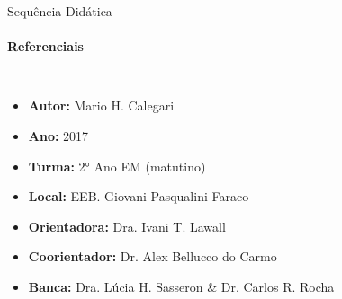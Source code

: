 \documentclass[aspectratio=169]{beamer}
\begin{document}
\begin{frame}{Sequência Didática}
	\framesubtitle{Referenciais}
	\begin{columns}

		\begin{itemize}
			\item \textbf{Autor:} Mario H. Calegari
			\item \textbf{Ano:} 2017
			\item \textbf{Turma:} 2° Ano EM (matutino)
			\item \textbf{Local:} EEB. Giovani Pasqualini Faraco
			\item \textbf{Orientadora:} Dra. Ivani T. Lawall
			\item \textbf{Coorientador:} Dr. Alex Bellucco do Carmo
			\item \textbf{Banca:} Dra. Lúcia H. Sasseron \& Dr. Carlos R. Rocha 
		\end{itemize}
	\end{columns}
\end{frame}
\end{document}
